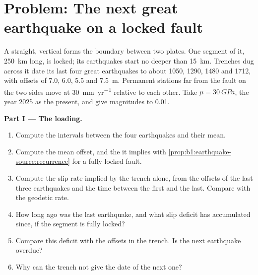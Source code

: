 \section{Problem: The next great earthquake on a locked fault}

\begin{problem}
\label{pb:b1:earthquake-source:1}
A straight, vertical  forms the boundary between two plates.
One segment of it, \qty{250}{km} long, is locked; its earthquakes start no
deeper than \qty{15}{km}. Trenches dug across it date its last four great
earthquakes to about 1050, 1290, 1480 and 1712, with offsets of \num{7.0},
\num{6.0}, \num{5.5} and \qty{7.5}{m}. Permanent stations far from the fault on
the two sides move at \qty{30}{mm.yr^{-1}} relative to each other. Take $\mu =
\qty{30}{GPa}$, the year 2025 as the present, and give magnitudes to 0.01.

\medskip
\noindent\textbf{Part I --- The loading.}
\begin{enumerate}
  \item Compute the intervals between the four earthquakes and their mean.
  \item Compute the mean offset, and the  it implies with
        \cref{prop:b1:earthquake-source:recurrence} for a fully locked fault.
  \item Compute the slip rate implied by the trench alone, from the offsets of
        the last three earthquakes and the time between the first and the last.
        Compare with the geodetic rate.
  \item How long ago was the last earthquake, and what slip deficit has
        accumulated since, if the segment is fully locked?
  \item Compare this deficit with the offsets in the trench. Is the next
        earthquake overdue?
  \item Why can the trench not give the date of the next one?
\end{enumerate}


\end{problem}
